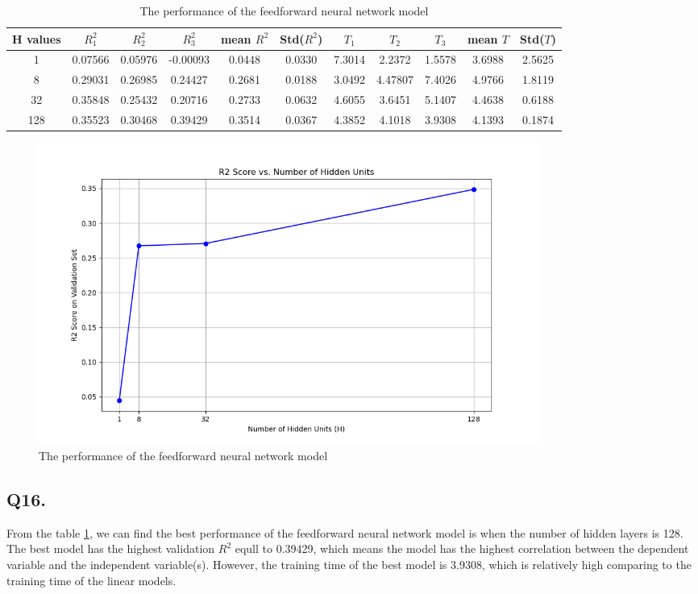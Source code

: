 \documentclass{article}
\begin{document}
\begin{table}[h!]
    \centering
    \small
    \begin{tabular}{|c|c|c|c|c|c|c|c|c|c|c|}
        \hline
        H values & $R^2_1$ & $R^2_2$ & $R^2_3$ & mean $R^2$ & Std($R^2$) & $T_1$ & $T_2$ & $T_3$ & mean $T$ & Std($T$) \\
        \hline
        1 & 0.07566 & 0.05976 &  -0.00093 & 0.0448 & 0.0330 & 7.3014 & 2.2372 & 1.5578  & 3.6988 & 2.5625\\
        8 & 0.29031 & 0.26985 & 0.24427 & 0.2681 & 0.0188 & 3.0492 & 4.47807 & 7.4026 & 4.9766 & 1.8119 \\
        32 & 0.35848 & 0.25432 & 0.20716 & 0.2733 & 0.0632 & 4.6055 & 3.6451 & 5.1407 & 4.4638 & 0.6188 \\
        128 & 0.35523 & 0.30468& 0.39429 & 0.3514 & 0.0367 & 4.3852 & 4.1018 & 3.9308 & 4.1393 & 0.1874 \\
        \hline
    \end{tabular}
    \caption{The performance of the feedforward neural network model}
    \label{tab:Feedforward}
\end{table}

\begin{figure}[h!]
    \centering
    \includegraphics[width=0.8\textwidth]{./pic/R2_Score_vs_Hidden_Units.png}
    \caption{The performance of the feedforward neural network model}
    \label{fig:feedforward}
\end{figure}


\subsection*{Q16.}

From the table \ref{tab:Feedforward}, we can find the best performance of the feedforward neural network model is when the number of hidden layers is 128.
The best model has the highest validation $R^2$ equll to 0.39429, which means the model has the highest correlation between the dependent variable and the independent variable(s).
However, the training time of the best model is 3.9308, which is relatively high comparing to the training time of the linear models.
\end{document}
